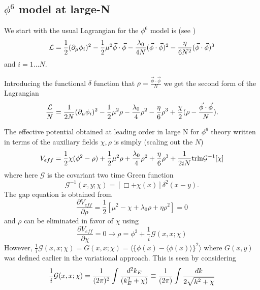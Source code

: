 \documentclass[a4paper,prd,preprint,superscriptaddress,showpacs,byrevtex]{revtex4}
\begin{document}
\subsection{$ \phi^6$ model at large-N}
 We start with the
usual Lagrangian for the $\phi^6$ model is  (see \cite{ref:BMB})
\begin{equation} {\cal L} = \frac{1}{2} (\partial_\mu \phi_i)^2 -
\frac{1}{2}
\mu^2  \vec \phi \cdot \vec \phi  -\frac{\lambda_0}{4N}  (\vec \phi
\cdot \vec \phi )^2-
\frac{\eta}{6 N^2}
 (\vec \phi
\cdot \vec \phi) ^3
\end{equation}
and $ i= 1 \ldots N$.

Introducing the functional $\delta$ function that $\rho= \frac{\vec \phi \cdot \vec
\phi}{N}$ we get the second form of the Lagrangian
\begin{equation} 
\frac {\cal L}{N}  = \frac{1}{2 N} (\partial_\mu \phi_i)^2 -
\frac{1}{2}
\mu^2  \rho  -\frac{\lambda_0}{4} \rho^2-
\frac{\eta}{6 }
\rho^3 + \frac{\chi}{2} (\rho - \frac{\vec \phi \cdot \vec \phi}{N}).
\end{equation}

The effective potential obtained at leading order in large N for $\phi^6$
theory written in terms of
the auxiliary fields $\chi,\rho$ is simply (scaling out the $N$)
\begin{equation}
V_{eff}=  \frac{1}{2} \chi( \phi^2 - \rho)  +\frac{1}{2} \mu^2 \rho + \frac
{\lambda_0}{ 4} \rho^2 +
\frac{\eta}{6} \rho^3 + \frac{1}{2iN} {\rm tr} {\ln} {\mathcal
G}^{-1}[\chi]
\end{equation}
where here ${\mathcal G}$ is the covariant two time Green function
\begin{equation}
{\mathcal G}^{-1}(x,y;\chi)= [\Box + \chi(x)] \delta^2 (x-y).
\end{equation}
The gap equation  is obtained from
\begin{equation}
\frac{\partial V_{eff}}{\partial \rho} = \frac{1}{2} [\mu^2 - \chi+\lambda_0 \rho
+ \eta \rho^2]= 0
\end{equation}
and $\rho$ can be eliminated in favor of $\chi$ using
\begin{equation}
\frac{\partial V_{eff}}{\partial \chi} =0 \rightarrow \rho=\phi^2 + \frac{1}{i}
{\mathcal G}(x,x;\chi)
\end{equation}
However, $\frac{1}{i} {\mathcal G}(x,x;\chi)= G(x,x;\chi)=
\langle \{\phi(x)-\langle \phi(x) \rangle \}^2 \rangle$  where $G(x,y)$ was
defined earlier in the
variational approach. This is seen by considering
\begin{equation}
\frac{1}{i} {\cal G}(x,x;\chi)=\frac{1} {(2 \pi)^2} \int \frac {d^2
k_E}{(k_E^2 +\chi)} \equiv \frac{1}
{(2
\pi)} \int
\frac {d k}{2 \sqrt{k^2 +\chi}}
\end{equation}
\end{document}
